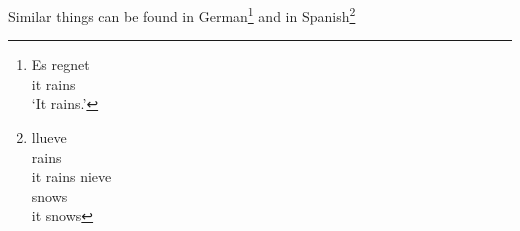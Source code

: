 Similar things can be found in German\footnote{%
\eafirst
    \gll Es regnet\\
    it rains\\
    \glt `It rains.'
  \zlast
} and in Spanish\footnote{%
\eafirst
    \ea
      \gll llueve\\
      rains\\
      \glt it rains
    \ex
      \gll nieve\\
      snows\\
      \glt it snows
    \z
  \z
}
